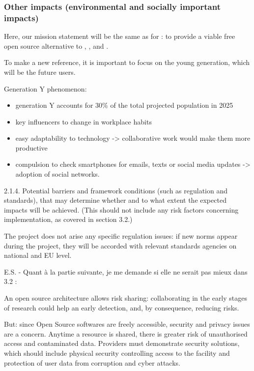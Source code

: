\subsubsection{Other impacts (environmental and socially important impacts)}


Here, our mission statement will be the same as for \Sage: to provide
a viable free open source alternative to \Magma, \Maple, \Mathematica
and \Matlab.

To make \TheProject a new reference, it is important to focus on the young
generation, which will be the future users.

Generation Y phenomenon:

\begin{itemize}
\item generation Y accounts for 30\% of the total projected population
in 2025
\item key influencers to change in workplace habits
\item easy adaptability to technology -{\textgreater} collaborative work
would make them more productive
\item compulsion to check smartphones for emails, texts or social media
updates -{\textgreater} adoption of social networks.
\end{itemize}
2.1.4. Potential barriers and framework conditions (such as regulation
and standards), that may determine whether and to what extent the
expected impacts will be achieved. (This should not include any risk
factors concerning implementation, as covered in section 3.2.)

The project does not arise any specific regulation issues: if new norms
appear during the project, they will be accorded with relevant
standards agencies on national and EU level.

E.S. - Quant à la partie suivante, je me demande si elle ne serait pas
mieux dans 3.2 :

An open source architecture allows risk sharing: collaborating in the
early stages of research could help an early detection, and, by
consequence, reducing risks.

But:  since Open Source softwares are freely accessible, security and
privacy issues are a concern. Anytime a resource is shared, there is
greater risk of unauthorised access and contaminated data.  Providers
must demonstrate security solutions, which should include physical
security controlling access to the facility and protection of user data
from corruption and cyber attacks.




